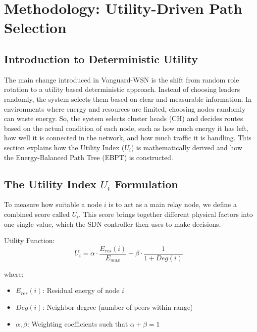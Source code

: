 \documentclass[conference]{IEEEtran}
\begin{document}
\section{Methodology: Utility-Driven Path Selection}

\subsection{Introduction to Deterministic Utility}
The main change introduced in Vanguard-WSN is the shift from random role rotation to a utility based deterministic approach. Instead of choosing leaders randomly, the system selects them based on clear and measurable information. In environments where energy and resources are limited, choosing nodes randomly can waste energy. So, the system selects cluster heads (CH) and decides routes based on the actual condition of each node, such as how much energy it has left, how well it is connected in the network, and how much traffic it is handling. This section explains how the Utility Index ($U_i$) is mathematically derived and how the Energy-Balanced Path Tree (EBPT) is constructed.

\subsection{The Utility Index $U_i$ Formulation}
To measure how suitable a node $i$ is to act as a main relay node, we define a combined score called $U_i$. This score brings together different physical factors into one single value, which the SDN controller then uses to make decisions.

Utility Function:
\begin{equation}
U_i = \alpha \cdot \frac{E_{res}(i)}{E_{max}} + \beta \cdot \frac{1}{1 + Deg(i)}
\end{equation}

where:
\begin{itemize}
    \item $E_{res}(i)$: Residual energy of node $i$
    \item $Deg(i)$: Neighbor degree (number of peers within range)
    \item $\alpha, \beta$: Weighting coefficients such that $\alpha + \beta = 1$
\end{itemize}
\end{document}
